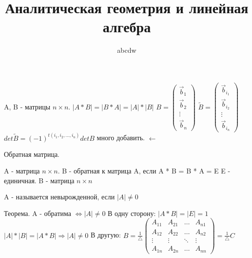 \documentclass[12pt]{article}
\title{Аналитическая геометрия и линейная алгебра}
\date{}
\author{abcdw}
\begin{document}
    \maketitle
    A, B - матрицы $n \times n$. \newline
    $|A * B| = |B * A| = |A| * |B|$ \newline
    $B = \begin{pmatrix}
        \vec b_1 \\
        \vec b_2 \\
        \vdots \\
        \vec b_n
    \end{pmatrix}$
    $\tilde B = \begin{pmatrix}
        \vec b_{i_1} \\
        \vec b_{i_2} \\
        \vdots \\
        \vec b_{i_n}
    \end{pmatrix}$
    $det \tilde B = (-1)^{t(i_1, i_2, \dots, i_n)} det B$ \newline
    много добавить. $\leftarrow$

    Обратная матрица. \newline

    A - матрица $n \times n$. \newline
    B - обратная к матрица A, если \newline
    A * B = B * A = E \newline
    E - единичная. \newline
    B - матрица $n \times n$ \newline

    A - называется невырожденной, если $|A| \not = 0$ \newline

    Теорема. \newline
    A - обратима $\Leftrightarrow |A| \not = 0$ \newline
    В одну сторону: \newline
    $|A * B| = |E| = 1$ \newline
    $|A| * |B| = |A * B| \Rightarrow |A| \not = 0$ \newline
    В другую: \newline
    $B = \frac1{\triangle}\begin{pmatrix}
        A_{11} & A_{21} & \dots & A_{n1} \\
        A_{12} & A_{22} & \dots & A_{n2} \\
        \vdots & \vdots & \ddots & \vdots \\
        A_{1n} & A_{2n} & \dots & A_{nn}
    \end{pmatrix} = \frac1{\triangle}C
    $
\end{document}
